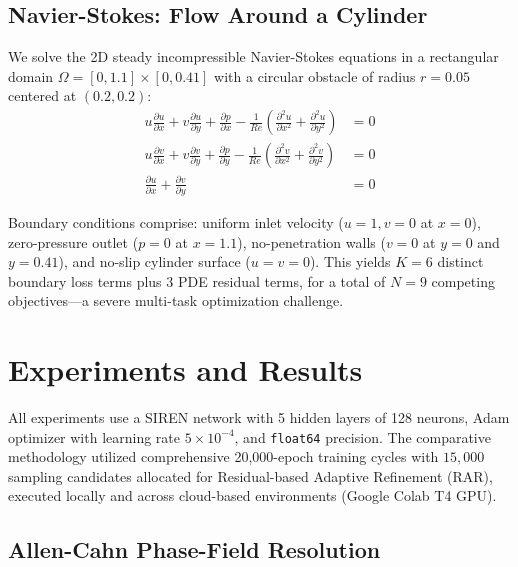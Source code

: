 \documentclass[conference]{IEEEtran}
\begin{document}
\subsection{Navier-Stokes: Flow Around a Cylinder}
We solve the 2D steady incompressible Navier-Stokes equations in a rectangular domain $\Omega = [0, 1.1] \times [0, 0.41]$ with a circular obstacle of radius $r = 0.05$ centered at $(0.2, 0.2)$:
\begin{align}
    u \frac{\partial u}{\partial x} + v \frac{\partial u}{\partial y} + \frac{\partial p}{\partial x} - \frac{1}{Re}\left(\frac{\partial^2 u}{\partial x^2} + \frac{\partial^2 u}{\partial y^2}\right) &= 0 \label{eq:ns_u}\\
    u \frac{\partial v}{\partial x} + v \frac{\partial v}{\partial y} + \frac{\partial p}{\partial y} - \frac{1}{Re}\left(\frac{\partial^2 v}{\partial x^2} + \frac{\partial^2 v}{\partial y^2}\right) &= 0 \label{eq:ns_v}\\
    \frac{\partial u}{\partial x} + \frac{\partial v}{\partial y} &= 0 \label{eq:continuity}
\end{align}

Boundary conditions comprise: uniform inlet velocity ($u=1, v=0$ at $x=0$), zero-pressure outlet ($p=0$ at $x=1.1$), no-penetration walls ($v=0$ at $y=0$ and $y=0.41$), and no-slip cylinder surface ($u=v=0$). This yields $K=6$ distinct boundary loss terms plus $3$ PDE residual terms, for a total of $N=9$ competing objectives---a severe multi-task optimization challenge.

\section{Experiments and Results}
\label{sec:experiments}

All experiments use a SIREN network with 5 hidden layers of 128 neurons, Adam optimizer with learning rate $5 \times 10^{-4}$, and \texttt{float64} precision. The comparative methodology utilized comprehensive 20{,}000-epoch training cycles with $15{,}000$ sampling candidates allocated for Residual-based Adaptive Refinement (RAR), executed locally and across cloud-based environments (Google Colab T4 GPU).
\subsection{Allen-Cahn Phase-Field Resolution}
\label{sec:ac_results}
\end{document}
